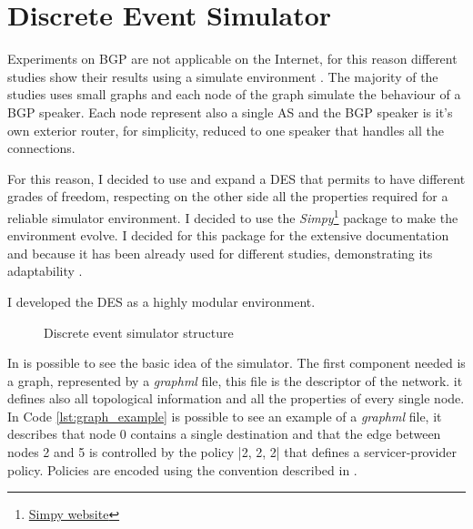 \chapter{Discrete Event Simulator}
\label{cha:des}

Experiments on \ac{BGP} are not applicable on the Internet, for this
reason different studies show their results using a simulate environment
\cite{griffin2001experimental} .
The majority of the studies uses small graphs and each node 
of the graph simulate the behaviour of a \ac{BGP} speaker.
Each node represent also a single \ac{AS} and the \ac{BGP} speaker is it's own
exterior router, for simplicity, reduced to one speaker that handles all the
connections. 
 
For this reason, I decided to use and expand a \ac{DES} that permits to have
different grades of freedom, respecting on the other side all the properties
required for a reliable simulator environment.
I decided to use the \textit{Simpy}\footnote{\href{https://simpy.readthedocs.io/en/latest/index.html}{Simpy website}}
package to make the environment evolve. I decided for this package for the
extensive documentation and because it has been already used for different
studies, demonstrating its adaptability \cite{matloff2008introduction,dagkakis2013manpy}.

I developed the \ac{DES} as a highly modular environment.
\begin{figure}[h]                                                               
    \begin{center}                                                              
        
    \end{center}                                                                
    \caption{Discrete event simulator structure}                                
    \label{fig:des_structure}                                                   
\end{figure}

In  is possible to see the basic idea of the simulator.
The first component needed is a graph, represented by a \textit{graphml} file, 
this file is the descriptor of the network. 
it defines also all topological information and all the properties of every single node.
In Code \ref{lst:graph_example} is possible to see an example of a \textit{graphml} file,
it describes that node \num{0} contains a single destination and that the edge
between nodes \num{2} and \num{5} is controlled by the policy |2, 2, 2| that defines
a servicer-provider policy.
Policies are encoded using the convention described in \cite{daggitt2018rate}.

